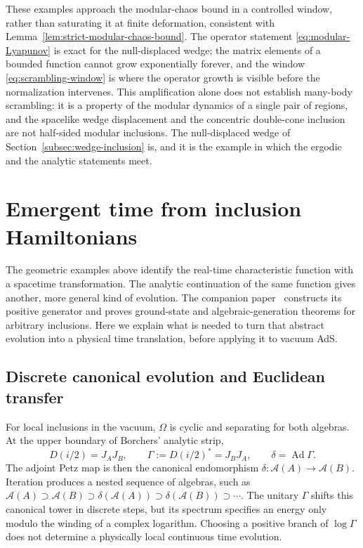 \documentclass[a4paper,11pt]{article}
\theoremstyle{definition}
\begin{document}
These examples approach the modular-chaos bound in a controlled window, rather than saturating it at finite deformation, consistent with Lemma~\ref{lem:strict-modular-chaos-bound}. The operator statement \eqref{eq:modular-Lyapunov} is exact for the null-displaced wedge; the matrix elements of a bounded function cannot grow exponentially forever, and the window \eqref{eq:scrambling-window} is where the operator growth is visible before the normalization intervenes. This amplification alone does not establish many-body scrambling: it is a property of the modular dynamics of a single pair of regions, and the spacelike wedge displacement and the concentric double-cone inclusion are not half-sided modular inclusions. The null-displaced wedge of Section~\ref{subsec:wedge-inclusion} is, and it is the example in which the ergodic and the analytic statements meet.

\section{Emergent time from inclusion Hamiltonians}\label{sec:emergent-time-qft}

The geometric examples above identify the real-time characteristic function with a spacetime transformation. The analytic continuation of the same function gives another, more general kind of evolution. The companion paper~\cite{companionQEC} constructs its positive generator and proves ground-state and algebraic-generation theorems for arbitrary inclusions. Here we explain what is needed to turn that abstract evolution into a physical time translation, before applying it to vacuum AdS.

\subsection{Discrete canonical evolution and Euclidean transfer}
\label{subsec:qft-discrete-euclidean}

For local inclusions in the vacuum, $\Omega$ is cyclic and separating for both algebras. At the upper boundary of Borchers' analytic strip,
\begin{equation}
 D(i/2)=J_AJ_B,\qquad
 \Gamma:=D(i/2)^*=J_BJ_A,
 \qquad \delta=\operatorname{Ad}\Gamma.
 \label{eq:qft-discrete-Gamma}
\end{equation}
The adjoint Petz map is then the canonical endomorphism $\delta:\mathcal A(A)\to\mathcal A(B)$. Iteration produces a nested sequence of algebras, such as $\mathcal A(A)\supset\mathcal A(B)\supset\delta(\mathcal A(A))\supset\delta(\mathcal A(B))\supset\cdots$. The unitary $\Gamma$ shifts this canonical tower in discrete steps, but its spectrum specifies an energy only modulo the winding of a complex logarithm. Choosing a positive branch of $\log\Gamma$ does not determine a physically local continuous time evolution.
\end{document}
